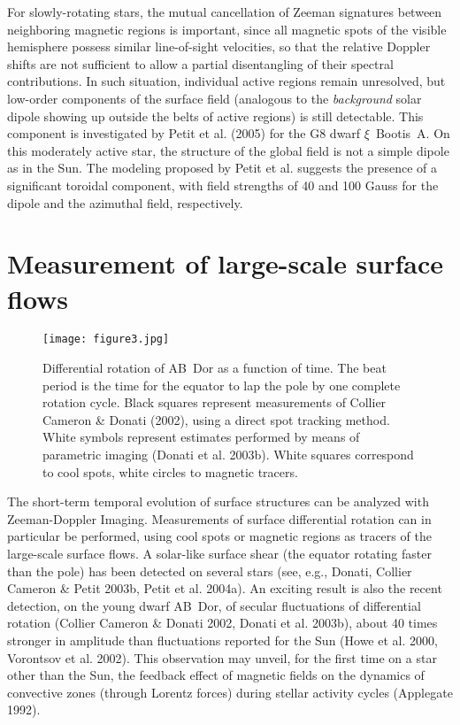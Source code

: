 \documentclass[11pt,twoside]{article}
\begin{document}
For slowly-rotating stars, the mutual cancellation of Zeeman signatures between neighboring magnetic regions is important, since all magnetic spots of the visible hemisphere possess similar line-of-sight velocities, so that the relative Doppler shifts are not sufficient to allow a partial disentangling of their spectral contributions. In such situation, individual active regions remain unresolved, but low-order components of the surface field (analogous to the {\it background} solar dipole showing up outside the belts of active regions) is still detectable. This component is investigated by Petit et al. (2005) for the G8 dwarf $\xi$~Bootis~A. On this moderately active star, the structure of the global field is not a simple dipole as in the Sun. The modeling proposed by Petit et al. suggests the presence of a significant toroidal component, with field strengths of 40 and 100 Gauss for the dipole and the azimuthal field, respectively.  

\section{Measurement of large-scale surface flows}

\begin{figure}[t]
   \centering
   \texttt{[image: figure3.jpg]}
   \caption{Differential rotation of AB~Dor as a function of time. The beat period is the time for the equator to lap the pole by one complete rotation cycle. Black squares represent measurements of Collier Cameron \& Donati (2002), using a direct spot tracking method. White symbols represent estimates performed by means of parametric imaging (Donati et al. 2003b). White squares correspond to cool spots, white circles to magnetic tracers.}
   \label{fig:hd199178}
\end{figure}

The short-term temporal evolution of surface structures can be analyzed with Zeeman-Doppler Imaging. Measurements of surface differential rotation can in particular be performed, using cool spots or magnetic regions as tracers of the large-scale surface flows. A solar-like surface shear (the equator rotating faster than the pole) has been detected on several stars (see, e.g., Donati, Collier Cameron \& Petit 2003b, Petit et al. 2004a). An exciting result is also the recent detection, on the young dwarf AB~Dor, of secular fluctuations of differential rotation (Collier Cameron \& Donati 2002, Donati et al. 2003b), about 40 times stronger in amplitude than fluctuations reported for the Sun (Howe et al. 2000, Vorontsov et al. 2002). This observation may unveil, for the first time on a star other than the Sun, the feedback effect of magnetic fields on the dynamics of convective zones (through Lorentz forces) during stellar activity cycles (Applegate 1992).
\end{document}
